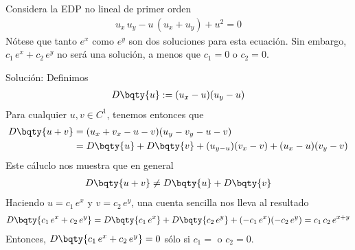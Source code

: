 \begin{ejemplo}
Considera la EDP no lineal de primer orden
\begin{align*}
u_{x} \, u_{y} - u \, (u_{x} + u_{y}) + u^{2} = 0
\end{align*}
Nótese que tanto $e^{x}$ como $e^{y}$ son dos soluciones para esta ecuación. Sin embargo, $c_{1} \, e^{x} + c_{2} \, e^{y}$ no será una solución, a menos que $c_{1} = 0$ o $c_{2} = 0$.
\par
Solución: Definimos
\begin{align*}
D \bqty{u} := (u_{x} - u)(u_{y} - u)
\end{align*}
Para cualquier $u, v \in C^{1}$, tenemos entonces que
\begin{align*}
D \bqty{u + v} &= (u_{x}  + v_{x} - u - v)(u_{y} - v_{y} - u -v) \\
&= D \bqty{u} + D \bqty{v} + (u_{y - u})(v_{x} - v) + (u_{x} - u)(v_{y} - v)
\end{align*}
Este cáluclo nos muestra que en general
\begin{align*}
D \bqty{u + v} \neq D \bqty{u} + D \bqty{v}
\end{align*}
Haciendo $u = c_{1} \, e^{x}$ y $v = c_{2} \, e^{y}$, una cuenta sencilla nos lleva al resultado
\begin{align*}
D \bqty{c_{1} \, e^{x} + c_{2} \, e^{y}} = D \bqty{c_{1} \, e^{x}} + D \bqty{c_{2} \, e^{y}} + (-c_{1} \, e^{x})(-c_{2} \, e^{y}) = c_{1} \, c_{2} \, e^{x + y} 
\end{align*}
Entonces, $D \bqty{c_{1} \, e^{x} + c_{2} \, e^{y}} = 0$ sólo si $c_{1} = $ o $c_{2} = 0$.
\end{ejemplo}
